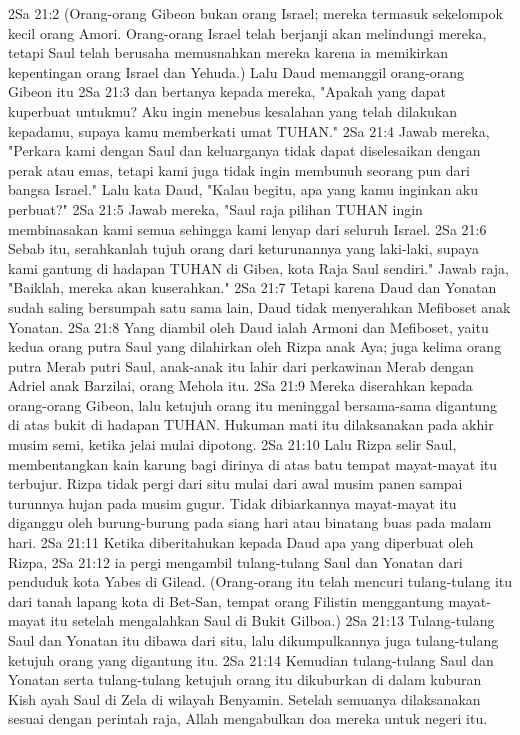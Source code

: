 2Sa 21:2  (Orang-orang Gibeon bukan orang Israel; mereka termasuk sekelompok kecil orang Amori. Orang-orang Israel telah berjanji akan melindungi mereka, tetapi Saul telah berusaha memusnahkan mereka karena ia memikirkan kepentingan orang Israel dan Yehuda.) Lalu Daud memanggil orang-orang Gibeon itu
2Sa 21:3  dan bertanya kepada mereka, "Apakah yang dapat kuperbuat untukmu? Aku ingin menebus kesalahan yang telah dilakukan kepadamu, supaya kamu memberkati umat TUHAN."
2Sa 21:4  Jawab mereka, "Perkara kami dengan Saul dan keluarganya tidak dapat diselesaikan dengan perak atau emas, tetapi kami juga tidak ingin membunuh seorang pun dari bangsa Israel." Lalu kata Daud, "Kalau begitu, apa yang kamu inginkan aku perbuat?"
2Sa 21:5  Jawab mereka, "Saul raja pilihan TUHAN ingin membinasakan kami semua sehingga kami lenyap dari seluruh Israel.
2Sa 21:6  Sebab itu, serahkanlah tujuh orang dari keturunannya yang laki-laki, supaya kami gantung di hadapan TUHAN di Gibea, kota Raja Saul sendiri." Jawab raja, "Baiklah, mereka akan kuserahkan."
2Sa 21:7  Tetapi karena Daud dan Yonatan sudah saling bersumpah satu sama lain, Daud tidak menyerahkan Mefiboset anak Yonatan.
2Sa 21:8  Yang diambil oleh Daud ialah Armoni dan Mefiboset, yaitu kedua orang putra Saul yang dilahirkan oleh Rizpa anak Aya; juga kelima orang putra Merab putri Saul, anak-anak itu lahir dari perkawinan Merab dengan Adriel anak Barzilai, orang Mehola itu.
2Sa 21:9  Mereka diserahkan kepada orang-orang Gibeon, lalu ketujuh orang itu meninggal bersama-sama digantung di atas bukit di hadapan TUHAN. Hukuman mati itu dilaksanakan pada akhir musim semi, ketika jelai mulai dipotong.
2Sa 21:10  Lalu Rizpa selir Saul, membentangkan kain karung bagi dirinya di atas batu tempat mayat-mayat itu terbujur. Rizpa tidak pergi dari situ mulai dari awal musim panen sampai turunnya hujan pada musim gugur. Tidak dibiarkannya mayat-mayat itu diganggu oleh burung-burung pada siang hari atau binatang buas pada malam hari.
2Sa 21:11  Ketika diberitahukan kepada Daud apa yang diperbuat oleh Rizpa,
2Sa 21:12  ia pergi mengambil tulang-tulang Saul dan Yonatan dari penduduk kota Yabes di Gilead. (Orang-orang itu telah mencuri tulang-tulang itu dari tanah lapang kota di Bet-San, tempat orang Filistin menggantung mayat-mayat itu setelah mengalahkan Saul di Bukit Gilboa.)
2Sa 21:13  Tulang-tulang Saul dan Yonatan itu dibawa dari situ, lalu dikumpulkannya juga tulang-tulang ketujuh orang yang digantung itu.
2Sa 21:14  Kemudian tulang-tulang Saul dan Yonatan serta tulang-tulang ketujuh orang itu dikuburkan di dalam kuburan Kish ayah Saul di Zela di wilayah Benyamin. Setelah semuanya dilaksanakan sesuai dengan perintah raja, Allah mengabulkan doa mereka untuk negeri itu.
